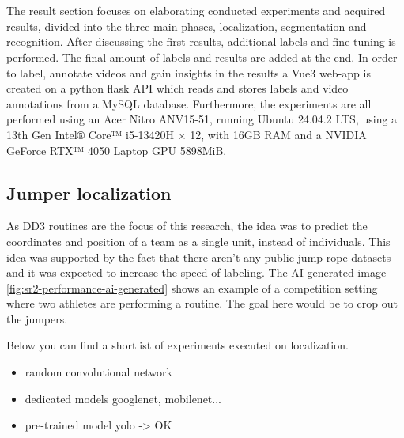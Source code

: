 
\chapter{}%
\label{ch:results}

The result section focuses on elaborating conducted experiments and acquired results, divided into the three main phases, localization, segmentation and recognition. After discussing the first results, additional labels and fine-tuning is performed. The final amount of labels and results are added at the end. In order to label, annotate videos and gain insights in the results a Vue3 web-app is created on a python flask API which reads and stores labels and video annotations from a MySQL database. Furthermore, the experiments are all performed using an Acer Nitro ANV15-51, running Ubuntu 24.04.2 LTS, using a 13th Gen Intel® Core™ i5-13420H × 12, with 16GB RAM and a NVIDIA GeForce RTX™ 4050 Laptop GPU 5898MiB.

\section{Jumper localization}
\label{results:jumper-localization}

As DD3 routines are the focus of this research, the idea was to predict the coordinates and position of a team as a single unit, instead of individuals. This idea was supported by the fact that there aren't any public jump rope datasets and it was expected to increase the speed of labeling. The AI generated image \ref{fig:sr2-performance-ai-generated} shows an example of a competition setting where two athletes are performing a routine. The goal here would be to crop out the jumpers.


Below you can find a shortlist of experiments executed on localization.

\begin{itemize}
    \item random convolutional network
    \item dedicated models googlenet, mobilenet...
    \item pre-trained model yolo -> OK
\end{itemize}

